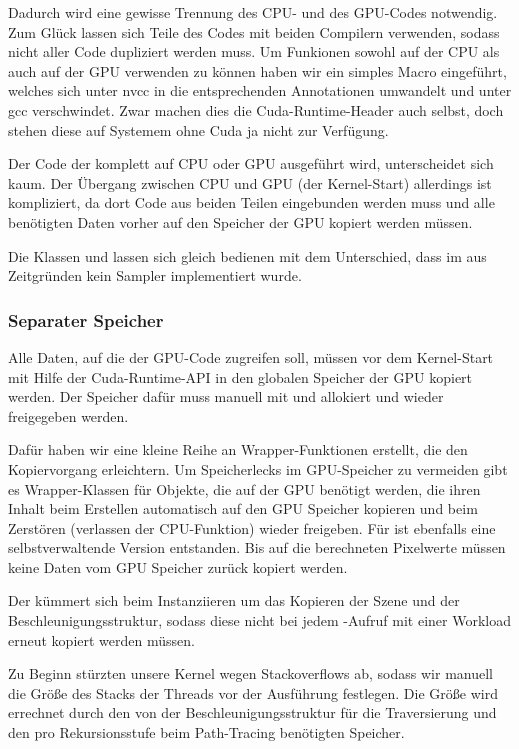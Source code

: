 Dadurch wird eine gewisse Trennung des CPU- und des GPU-Codes notwendig. Zum Glück lassen sich Teile des Codes mit beiden Compilern verwenden, sodass nicht aller Code dupliziert werden muss. 
Um Funkionen sowohl auf der CPU als auch auf der GPU verwenden zu können haben wir ein simples Macro  eingeführt, welches sich unter nvcc in die entsprechenden Annotationen umwandelt und unter gcc verschwindet. 
Zwar machen dies die Cuda-Runtime-Header auch selbst, doch stehen diese auf Systemem ohne Cuda ja nicht zur Verfügung. 

Der Code der komplett auf CPU oder GPU ausgeführt wird, unterscheidet sich kaum. 
Der Übergang zwischen CPU und GPU (der Kernel-Start) allerdings ist kompliziert, da dort Code aus beiden Teilen eingebunden werden muss und alle benötigten Daten vorher auf den Speicher der GPU kopiert werden müssen. 

Die Klassen  und  lassen sich gleich bedienen mit dem Unterschied, dass im  aus Zeitgründen kein Sampler implementiert wurde. 


\subsubsection{Separater Speicher}

Alle Daten, auf die der GPU-Code zugreifen soll, müssen vor dem Kernel-Start mit Hilfe der Cuda-Runtime-API in den globalen Speicher der GPU kopiert werden. Der Speicher dafür muss manuell mit  und  allokiert und wieder freigegeben werden. 

Dafür haben wir eine kleine Reihe an Wrapper-Funktionen erstellt, die den Kopiervorgang erleichtern. 
Um Speicherlecks im GPU-Speicher zu vermeiden gibt es Wrapper-Klassen für Objekte, die auf der GPU benötigt werden, die ihren Inhalt beim Erstellen automatisch auf den GPU Speicher kopieren und beim Zerstören (verlassen der CPU-Funktion) wieder freigeben. 
Für  ist ebenfalls eine selbstverwaltende Version  entstanden. 
Bis auf die berechneten Pixelwerte müssen keine Daten vom GPU Speicher zurück kopiert werden. 

Der  kümmert sich beim Instanziieren um das Kopieren der Szene und der Beschleunigungsstruktur, sodass diese nicht bei jedem -Aufruf mit einer Workload erneut kopiert werden müssen. 

Zu Beginn stürzten unsere Kernel wegen Stackoverflows ab, sodass wir manuell die Größe des Stacks der Threads vor der Ausführung festlegen. 
Die Größe wird errechnet durch den von der Beschleunigungsstruktur für die Traversierung und den pro Rekursionsstufe beim Path-Tracing benötigten Speicher. 


